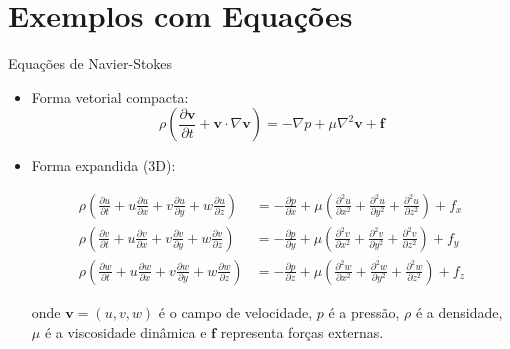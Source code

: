 \section{Exemplos com Equações}
\begin{frame}{Equações de Navier-Stokes}
    \footnotesize
    \begin{itemize}
        \item Forma vetorial compacta:
        \vspace{-0.2cm}
        \begin{equation*}
            \rho\left(\frac{\partial \mathbf{v}}{\partial t} + \mathbf{v} \cdot \nabla\mathbf{v}\right) = -\nabla p + \mu\nabla^2\mathbf{v} + \mathbf{f}
        \end{equation*}
        
        \item Forma expandida (3D):
        \vspace{-0.2cm}
        
        \begin{align*}
            \rho\left(\frac{\partial u}{\partial t} + u\frac{\partial u}{\partial x} + v\frac{\partial u}{\partial y} + w\frac{\partial u}{\partial z}\right) &= -\frac{\partial p}{\partial x} + \mu\left(\frac{\partial^2 u}{\partial x^2} + \frac{\partial^2 u}{\partial y^2} + \frac{\partial^2 u}{\partial z^2}\right) + f_x \\[0.3cm]
            \rho\left(\frac{\partial v}{\partial t} + u\frac{\partial v}{\partial x} + v\frac{\partial v}{\partial y} + w\frac{\partial v}{\partial z}\right) &= -\frac{\partial p}{\partial y} + \mu\left(\frac{\partial^2 v}{\partial x^2} + \frac{\partial^2 v}{\partial y^2} + \frac{\partial^2 v}{\partial z^2}\right) + f_y \\[0.3cm]
            \rho\left(\frac{\partial w}{\partial t} + u\frac{\partial w}{\partial x} + v\frac{\partial w}{\partial y} + w\frac{\partial w}{\partial z}\right) &= -\frac{\partial p}{\partial z} + \mu\left(\frac{\partial^2 w}{\partial x^2} + \frac{\partial^2 w}{\partial y^2} + \frac{\partial^2 w}{\partial z^2}\right) + f_z
        \end{align*}

        \small
        onde $\mathbf{v} = (u,v,w)$ é o campo de velocidade, $p$ é a pressão, $\rho$ é a densidade,\\
        $\mu$ é a viscosidade dinâmica e $\mathbf{f}$ representa forças externas.
    \end{itemize}
\end{frame}